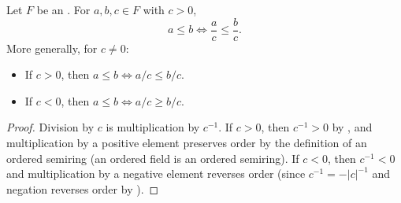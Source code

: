 \begin{proposition} \label{proposition:division_preserves_order_in_ordered_field}
    Let $F$ be an . For $a,b,c \in F$ with $c > 0$,
    $$a \le b \iff \frac{a}{c} \le \frac{b}{c}.$$
    More generally, for $c \neq 0$:
    \begin{itemize}
        \item If $c > 0$, then $a \le b \iff a/c \le b/c$.
        \item If $c < 0$, then $a \le b \iff a/c \ge b/c$.
    \end{itemize}
\end{proposition}
\begin{proof}
    Division by $c$ is multiplication by $c^{-1}$. If $c > 0$, then $c^{-1} > 0$ by , and multiplication by a positive element preserves order by the definition of an ordered semiring (an ordered field is an ordered semiring). If $c < 0$, then $c^{-1} < 0$ and multiplication by a negative element reverses order (since $c^{-1} = -|c|^{-1}$ and negation reverses order by ).
\end{proof}